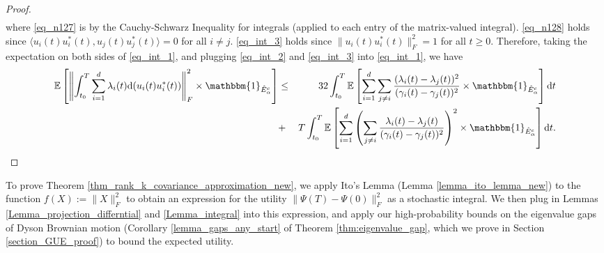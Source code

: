 \documentclass[11pt,letterpaper]{article}
\begin{document}
\begin{proof}
\begin{eqnarray}
\end{eqnarray}
% 
where \eqref{eq_n127} is by the Cauchy-Schwarz Inequality for integrals (applied to each entry of the matrix-valued integral).
%
\eqref{eq_n128} holds since $\langle u_i(t) u_i^\ast(t) , u_j(t) u_j^\ast(t) \rangle = 0$ for all $i \neq j$.
%
\eqref{eq_int_3} holds since $\| u_i(t) u_i^\ast(t) \|_F^2=1$ for all $t \geq 0$.
%
Therefore, taking the expectation on both sides of \eqref{eq_int_1}, and plugging \eqref{eq_int_2} and  \eqref{eq_int_3} into  \eqref{eq_int_1}, we have
%
%
\begin{eqnarray} \label{eq_int_4}
\mathbb{E}\left[\left\|\int_{t_0}^T \sum_{i=1}^d   \lambda_i(t) \mathrm{d}( u_i(t) u_i^\ast(t))\right\|_F^2   \times \mathbbm{1}_{\hat{E}_\alpha^c} \right] &\leq&  32\int_{t_0}^{T}   \mathbb{E}\left[ \sum_{i=1}^{d}  \sum_{j \neq i}  \frac{(\lambda_i(t) - \lambda_j(t))^2}{(\gamma_i(t) - \gamma_j(t))^2}  \times \mathbbm{1}_{\hat{E}_\alpha^c} \right]\mathrm{d}t \nonumber\\
%
  &+&   T \int_{t_0}^{T}\mathbb{E}\left[\sum_{i=1}^{d}\left(\sum_{j\neq i} \frac{\lambda_i(t) - \lambda_j(t)}{(\gamma_i(t) - \gamma_j(t))^2}\right)^2 \times \mathbbm{1}_{\hat{E}_\alpha^c} \right] \mathrm{d}t .
\end{eqnarray}
\end{proof}



\noindent
To prove Theorem \ref{thm_rank_k_covariance_approximation_new}, we apply Ito’s Lemma (Lemma \ref{lemma_ito_lemma_new}) to the function $f(X) := \| X \|_F^2$ to obtain an expression for the utility $\| \Psi(T) - \Psi(0) \|_F^2$ as a stochastic integral.
%
 We then plug in Lemmas \ref{Lemma_projection_differntial} and \ref{Lemma_integral} into this expression, and apply our high-probability bounds on the eigenvalue gaps of Dyson Brownian motion (Corollary \ref{lemma_gaps_any_start} of Theorem \ref{thm:eigenvalue_gap}, which we prove in Section \ref{section_GUE_proof}) to bound the expected utility. 
\end{document}
